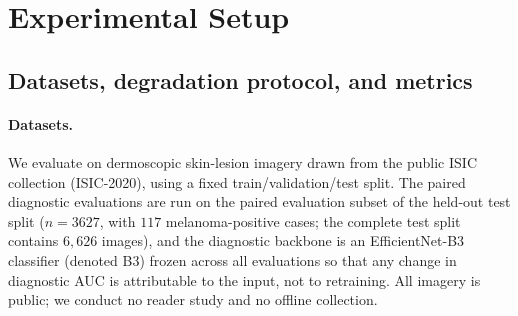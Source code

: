 %

\section{Experimental Setup}
\label{sec:setup}

\subsection{Datasets, degradation protocol, and metrics}
\label{subsec:setup-data}

\paragraph{Datasets.}
We evaluate on dermoscopic skin-lesion imagery drawn from the public ISIC
collection (ISIC-2020), using a fixed train/validation/test split. The paired
diagnostic evaluations are run on the paired evaluation subset of the held-out
test split ($n=3627$, with $117$ melanoma-positive cases; the complete test
split contains $6{,}626$ images), and the diagnostic backbone is an
EfficientNet-B3 classifier (denoted B3) frozen across all evaluations so that
any change in diagnostic AUC is attributable to the input, not to retraining.
All imagery is public; we conduct no reader study and no offline collection.

